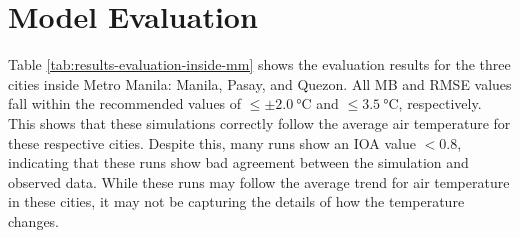\section{Model Evaluation}
	Table \ref{tab:results-evaluation-inside-mm} shows the evaluation results for the three cities inside Metro Manila: Manila, Pasay, and Quezon.
	All MB and RMSE values fall within the recommended values of $\leq \pm \qty{2.0}{\degreeCelsius}$ and $\leq \qty{3.5}{\degreeCelsius}$, respectively.
	This shows that these simulations correctly follow the average air temperature for these respective cities.
	Despite this, many runs show an IOA value $< 0.8$, indicating that these runs show bad agreement between the simulation and observed data.
	While these runs may follow the average trend for air temperature in these cities, it may not be capturing the details of how the temperature changes.
	
